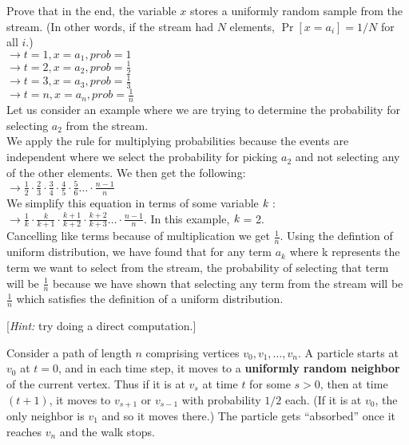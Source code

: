 \documentclass[addpoints, 11pt]{exam}
\begin{document}
\begin{questions}
  Prove that in the end, the variable $x$ stores a uniformly random sample from the stream. (In other words, if the stream had $N$ elements, $\Pr[ x= a_i] = 1/N$ for all $i$.) \\
  $\rightarrow t = 1, x = a_1, prob = 1$ \\
  $\rightarrow t = 2, x = a_2, prob = \frac{1}{2}$ \\
  $\rightarrow t = 3, x = a_3, prob = \frac{1}{3}$ \\
  $\rightarrow t = n, x = a_n, prob = \frac{1}{n}$ \\

  Let us consider an example where we are trying to determine the probability for selecting $a_2$ from the stream. \\
  We apply the rule for multiplying probabilities because the events are independent where we select the probability for picking $a_2$ and not selecting any of the other elements.
  We then get the following: \\
  $\rightarrow \frac{1}{2} \cdot{\frac{2}{3}} \cdot{\frac{3}{4}} \cdot{\frac{4}{5}} \cdot{\frac{5}{6}} \dots \cdot{\frac{n-1}{n}}$ \\
  We simplify this equation in terms of some variable $\emph{k}$ : \\
  $\rightarrow \frac{1}{k} \cdot{\frac{k}{k + 1}} \cdot{\frac{k + 1}{k + 2}} \cdot{\frac{k + 2}{k + 3}} \dots \cdot{\frac{n - 1}{n}}$. In this example, $\emph{k}$ = 2. \\
  Cancelling like terms because of multiplication we get $\frac{1}{n}$. Using the defintion of uniform distribution, we have found that for any term $a_k$ where k represents the term we want to select
  from the stream, the probability of selecting that term will be $\frac{1}{n}$ because we have shown that selecting any term from the stream will be $\frac{1}{n}$ which satisfies
  the definition of a uniform distribution.


    [{\em Hint:} try doing a direct computation.]

  Consider a path of length $n$ comprising vertices $v_0, v_1, \dots, v_n$.  A particle starts at $v_0$ at $t=0$, and in each time step, it moves to a {\bf uniformly random neighbor} of the current vertex. Thus if it is at $v_s$ at time $t$ for some $s>0$, then at time $(t+1)$, it moves to $v_{s+1}$ or $v_{s-1}$ with probability $1/2$ each. (If it is at $v_0$, the only neighbor is $v_1$ and so it moves there.) The particle gets ``absorbed'' once it reaches $v_n$ and the walk stops.


\end{questions}
\end{document}
